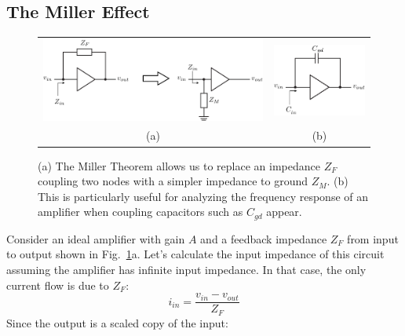 \subsection{The Miller Effect}
\begin{figure}[tb]
\centering
\begin{tabular}{cc}
\includegraphics[scale=.9]{miller2} &
\includegraphics[scale=.9]{miller_cap}\\
(a) & (b)\\
\end{tabular}
\caption{(a) The Miller Theorem allows us to replace an impedance $Z_F$ coupling two nodes with a simpler impedance to ground $Z_M$.  (b) This is particularly useful for analyzing the frequency response of an amplifier when coupling capacitors such as $C_{gd}$ appear.}
\label{fig:miller1}
\end{figure}
Consider an ideal amplifier with gain $A$ and a feedback impedance $Z_F$ from input to output shown in Fig.~\ref{fig:miller1}a.  Let's calculate the input impedance of this circuit assuming the amplifier has infinite input impedance.  In that case, the only current flow is due to $Z_F$:
    \begin{equation}
        i_{in} = \frac{v_{in} - v_{out}}{Z_F}
    \end{equation}
Since the output is a scaled copy of the input:
